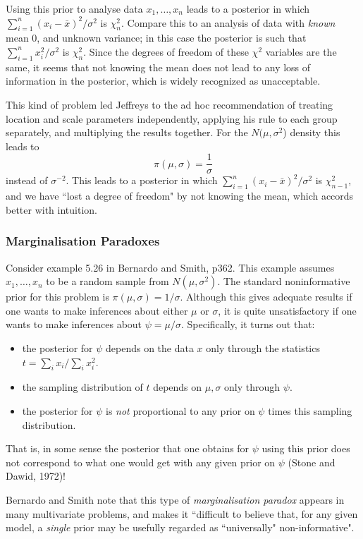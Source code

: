 \documentclass[12pt]{article}
\begin{document}
Using this prior to analyse data $x_1,\dots,x_n$ leads to a posterior in which $\sum_{i=1}^n (x_i - \bar{x})^2 / \sigma^2$ is $\chi_n^2$. Compare this to an analysis of data with {\it known} mean $0$,
and unknown variance; in this case the posterior is such that $\sum_{i=1}^n x_i^2/\sigma^2$ is 
$\chi_n^2$. Since the degrees of freedom of these $\chi^2$ variables are the same, it seems that not knowing the mean does not lead to any loss of information
in the posterior, which is widely recognized as unacceptable. 

This kind of problem led Jeffreys to the ad hoc recommendation
of treating location and scale parameters independently, applying his rule to each group
separately, and multiplying the results together.
For the  $N(\mu,\sigma^2$) density this leads to $$\pi(\mu, \sigma) = \frac{1}{\sigma}$$
instead of $\sigma^{-2}$. This leads to a posterior in which $\sum_{i=1}^n (x_i - \bar{x})^2 / \sigma^2$ is $\chi_{n-1}^2$, and we have ``lost a degree of freedom" by not knowing the mean, which accords
better with intuition. 

\subsubsection{Marginalisation Paradoxes}

Consider example 5.26 in Bernardo and Smith, p362.
This example assumes $x_1,\dots,x_n$ to be a random sample from $N(\mu, \sigma^2)$.
The standard noninformative prior for this problem is $\pi(\mu,\sigma) = 1/\sigma$. Although this
gives adequate results if one wants to make inferences about either $\mu$ or $\sigma$, it is quite
unsatisfactory if one wants to make inferences about $\psi = \mu/\sigma$.
Specifically, it turns out that:
\begin{itemize}
\item the posterior for $\psi$ depends on the data $x$ only through
the statistics $t = \sum_i x_i / \sum_i x_i^2$.
\item the sampling distribution of $t$ depends on $\mu,\sigma$ only
through $\psi$.
\item the posterior for $\psi$ is {\it not} proportional to any prior on $\psi$ times
this sampling distribution.
\end{itemize}
That is, in some sense the posterior
that one obtains for $\psi$ using this prior does not correspond to what one would get
with any given prior on $\psi$ (Stone and Dawid, 1972)!

Bernardo and Smith note that this type of {\it marginalisation paradox} appears in many multivariate
problems, and makes it ``difficult to believe that, for any given model, a {\it single} prior may be usefully
regarded as ``universally" non-informative".
\end{document}
